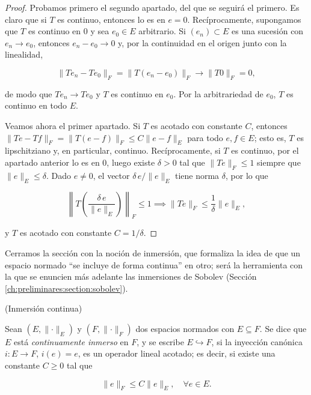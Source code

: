 \begin{proof}
Probamos primero el segundo apartado, del que se seguirá el primero. Es claro que
si $T$ es continuo, entonces lo es en $e = 0$. Recíprocamente, supongamos que $T$
es continuo en $0$ y sea $e_0 \in E$ arbitrario. Si $(e_n) \subset E$ es una
sucesión con $e_n \rightarrow e_0$, entonces $e_n - e_0 \rightarrow 0$ y, por la
continuidad en el origen junto con la linealidad,

\[\lVert Te_n - Te_0 \rVert_F = \lVert T(e_n - e_0) \rVert_F \rightarrow \lVert T0 \rVert_F = 0,\]

de modo que $Te_n \rightarrow Te_0$ y $T$ es continuo en $e_0$. Por la
arbitrariedad de $e_0$, $T$ es continuo en todo $E$.

Veamos ahora el primer apartado. Si $T$ es acotado con constante $C$, entonces
$\lVert Te - Tf \rVert_F = \lVert T(e - f) \rVert_F \leq C \lVert e - f \rVert_E$
para todo $e, f \in E$; esto es, $T$ es lipschitziano y, en particular, continuo.
Recíprocamente, si $T$ es continuo, por el apartado anterior lo es en $0$, luego
existe $\delta > 0$ tal que $\lVert Te \rVert_F \leq 1$ siempre que
$\lVert e \rVert_E \leq \delta$. Dado $e \neq 0$, el vector
$\delta \, e / \lVert e \rVert_E$ tiene norma $\delta$, por lo que

\[\left\lVert T\!\left(\frac{\delta \, e}{\lVert e \rVert_E}\right)\right\rVert_F \leq 1 \implies \lVert Te \rVert_F \leq \frac{1}{\delta} \lVert e \rVert_E,\]

y $T$ es acotado con constante $C = 1/\delta$.
\end{proof}

Cerramos la sección con la noción de inmersión, que formaliza la idea de que un
espacio normado ``se incluye de forma continua'' en otro; será la herramienta con
la que se enuncien más adelante las inmersiones de Sobolev
(Sección \ref{ch:preliminares:section:sobolev}).\\

\begin{Definicion}{(Inmersión continua)}
\label{ch:preliminares:def:inmersion}

Sean $(E, \lVert \cdot \rVert_E)$ y $(F, \lVert \cdot \rVert_F)$ dos espacios
normados con $E \subseteq F$. Se dice que $E$ está \textit{continuamente inmerso}
en $F$, y se escribe $E \hookrightarrow F$, si la inyección canónica
$i : E \rightarrow F$, $i(e) = e$, es un operador lineal acotado; es decir, si
existe una constante $C \geq 0$ tal que

\[\lVert e \rVert_F \leq C \lVert e \rVert_E, \quad \forall e \in E.\]
\end{Definicion}

